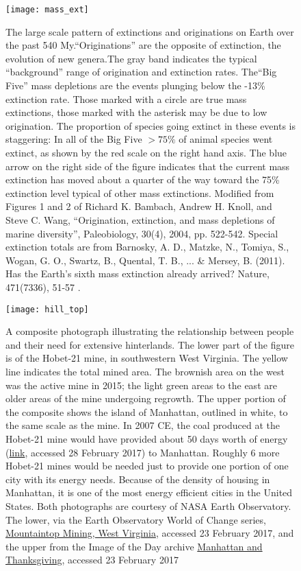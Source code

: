 \newpage
\begin{figure}[p]
\centering
\texttt{[image: mass\_ext]}%
\caption{The large scale pattern of extinctions and originations on Earth over the past 540 My.``Originations'' are the opposite of extinction, the evolution of new genera.The gray band indicates the typical ``background'' range of origination and extinction rates. The``Big Five'' mass depletions are the events plunging below the -13\% extinction rate. Those marked with a circle are true mass extinctions, those marked with the asterisk may be due to low origination. The proportion of species going extinct in these events is staggering: In all of the Big Five $>75\%$ of animal species went extinct, as shown by the red scale on the right hand axis. The blue arrow on the right side of the figure indicates that the current mass extinction has moved about a quarter of the way toward the 75\% extinction level typical of other mass extinctions. Modified from Figures 1 and 2 of Richard K. Bambach, Andrew H. Knoll, and Steve C. Wang, ``Origination, extinction, and mass depletions of marine diversity'', Paleobiology, 30(4), 2004, pp. 522-542. Special extinction totals are from Barnosky, A. D., Matzke, N., Tomiya, S., Wogan, G. O., Swartz, B., Quental, T. B., ... \& Mersey, B. (2011). Has the Earth's sixth mass extinction already arrived? Nature, 471(7336), 51-57 .}
\label{fig:mass_ext}
\end{figure}

\newpage
\begin{figure}[p]
\centering
\texttt{[image: hill\_top]}%

\caption{A composite photograph illustrating the relationship between people and their need for extensive hinterlands. The lower part of the figure is of the Hobet-21 mine, in southwestern West Virginia. The yellow line indicates the total mined area. The brownish area on the west was the active mine in 2015; the light green areas to the east are older areas of the mine undergoing regrowth. The  upper portion of the composite shows the island of Manhattan, outlined in white, to the same scale as the mine. In 2007 CE, the coal produced at the Hobet-21 mine would have provided about 50 days worth of energy (\href{https://www.nycedc.com/economic-data/july-2013-economic-snapshot}{link}, accessed 28 February 2017) to Manhattan. Roughly 6 more Hobet-21 mines would be needed just to provide one portion of one city with its energy needs. Because of the density of housing in Manhattan, it is one of the most energy efficient cities in the United States. Both photographs are courtesy of NASA Earth Observatory. The lower, via the Earth Observatory World of Change series, \href{http://earthobservatory.nasa.gov/Features/WorldOfChange/hobet.php}{Mountaintop Mining, West Virginia}, accessed 23 February 2017, and the upper from the Image of the Day archive \href{http://earthobservatory.nasa.gov/IOTD/view.php?id=82417}{Manhattan and Thanksgiving}, accessed 23 February 2017}  

\label{fig:hill_top}
\end{figure}

